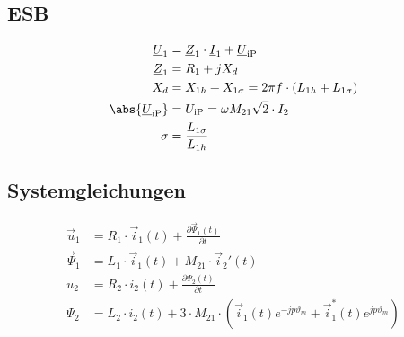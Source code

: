 \begin{sectionbox}
\subsection{ESB}
\begin{center}

\end{center}
\begin{align*}
\underline{U}_1 &= \underline{Z}_1\cdot\underline{I}_1 + \underline{U}_\text{iP}\\
\underline{Z}_1 &= R_1 + jX_d\\
X_d &= X_{1h} + X_{1\sigma} = 2\pi f\cdot (L_{1h} + L_{1\sigma})\\
\abs{\underline{U}_\text{iP}} &= U_\text{iP} = \omega M_{21}\sqrt{2}\cdot I_2\\
\sigma &= \frac{L_{1\sigma}}{L_{1h}}
\end{align*}

\subsection{Systemgleichungen}
\begin{align*}
\vec{u}_1 &= R_1\cdot\vec{i}_1(t) + \frac{\partial\vec{\Psi}_1(t)}{\partial t}\\
\vec{\Psi}_1 &= L_1\cdot\vec{i}_1(t) + M_{21}\cdot\vec{i}_2'(t)\\
u_2 &= R_2\cdot i_2(t) + \frac{\partial\Psi_2(t)}{\partial t}\\
\Psi_2 &= L_2\cdot i_2(t) + 3\cdot M_{21}\cdot(\vec{i}_1(t)e^{-jp\vartheta_m} + \vec{i}_1^*(t)e^{jp\vartheta_m})\\
\end{align*}
\end{sectionbox}

